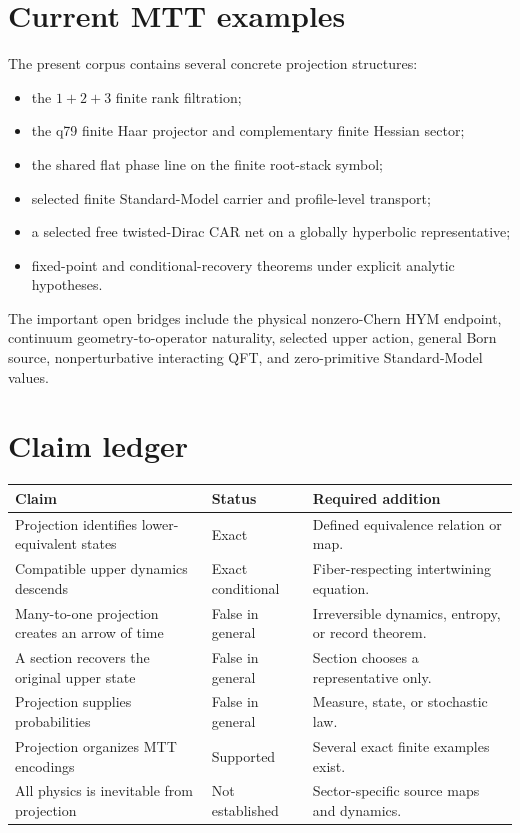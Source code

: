\documentclass[11pt]{article}
\begin{document}
\section{Current MTT examples}

The present corpus contains several concrete projection structures:
\begin{itemize}
\item the \(1+2+3\) finite rank filtration;
\item the q79 finite Haar projector and complementary finite Hessian sector;
\item the shared flat phase line on the finite root-stack symbol;
\item selected finite Standard-Model carrier and profile-level transport;
\item a selected free twisted-Dirac CAR net on a globally hyperbolic
representative;
\item fixed-point and conditional-recovery theorems under explicit analytic
hypotheses.
\end{itemize}

The important open bridges include the physical nonzero-Chern HYM endpoint,
continuum geometry-to-operator naturality, selected upper action, general
Born source, nonperturbative interacting QFT, and zero-primitive
Standard-Model values.

\section{Claim ledger}

\begin{center}
\begin{tabularx}{\textwidth}{@{}
>{\raggedright\arraybackslash}p{}
>{\raggedright\arraybackslash}p{}
>{\raggedright\arraybackslash}X@{}}
\toprule
Claim & Status & Required addition\\
\midrule
Projection identifies lower-equivalent states & Exact &
Defined equivalence relation or map.\\
Compatible upper dynamics descends & Exact conditional &
Fiber-respecting intertwining equation.\\
Many-to-one projection creates an arrow of time & False in general &
Irreversible dynamics, entropy, or record theorem.\\
A section recovers the original upper state & False in general &
Section chooses a representative only.\\
Projection supplies probabilities & False in general &
Measure, state, or stochastic law.\\
Projection organizes MTT encodings & Supported &
Several exact finite examples exist.\\
All physics is inevitable from projection & Not established &
Sector-specific source maps and dynamics.\\
\bottomrule
\end{tabularx}
\end{center}
\end{document}
